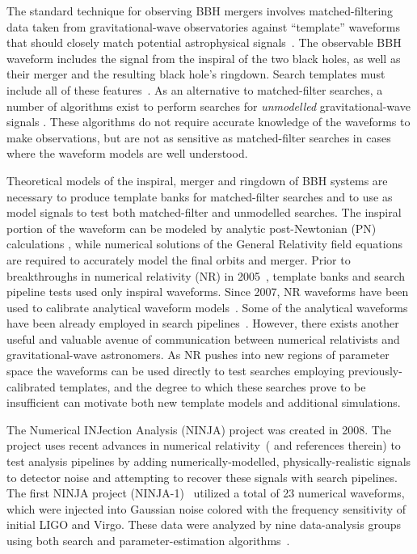 \documentclass[12pt]{iopart}
\begin{document}
The standard technique for observing BBH mergers
involves matched-filtering data taken from gravitational-wave observatories 
against ``template'' waveforms that should closely match potential 
astrophysical signals~\cite{Wainstein:1962,Wainstein:1968,Allen:2005fk}. The
observable BBH waveform includes the signal from the inspiral of the
two black holes, as well as their merger and the resulting black
hole's ringdown. Search templates must include all of these
features~\cite{Buonanno:2009zt,Brown:2012nn}.  As an alternative to
matched-filter searches, a number of algorithms exist to perform
searches for \emph{unmodelled} gravitational-wave signals
\cite{Klimenko:2008fu,Searle:2007uv,Sutton:2009gi}. These algorithms
do not require accurate knowledge of the waveforms to make
observations, but are not as sensitive as matched-filter searches in
cases where the waveform models are well understood.

Theoretical models of the inspiral, merger and ringdown of BBH systems
are necessary to produce template banks for matched-filter searches
and to use as model signals to test both matched-filter and unmodelled
searches.  The inspiral portion of the waveform can be modeled by
analytic post-Newtonian (PN) calculations
\cite{Blanchet:2006zz,Buonanno:2009zt}, while numerical solutions of
the General Relativity field equations are required to accurately
model the final orbits and merger.  Prior to breakthroughs in
numerical relativity (NR) in
2005~\cite{Pretorius:2005gq,Campanelli:2005dd, Baker:2005vv}, template
banks and search pipeline tests used only inspiral waveforms.  Since
2007, NR waveforms have been used to calibrate analytical waveform
models~\cite{Buonanno:2007pf,Damour:2009kr,Pan:2011gk,Taracchini:2012ig,
Ajith:2009bn,Santamaria:2010yb,Damour:2012ky,Taracchini:2013rva}. Some
of the analytical waveforms have been already employed in search
pipelines~\cite{Aasi:2012rja}.  However, there exists another
useful and valuable avenue of communication between numerical
relativists and gravitational-wave astronomers.  As NR pushes into new
regions of parameter space the waveforms can be used directly to test
searches employing previously-calibrated templates, and the degree to
which these searches prove to be insufficient can motivate both new
template models and additional simulations.

The Numerical INJection Analysis (NINJA) project was created in 2008. 
The project uses recent 
advances in numerical relativity~(\cite{Centrella:2010mx} and references
therein) to test analysis 
pipelines by adding numerically-modelled, physically-realistic signals to 
detector noise and attempting to recover these signals with search pipelines.
The first NINJA project (NINJA-1)~\cite{Aylott:2009ya} utilized a total of
23 numerical waveforms, which were injected into Gaussian noise colored with
the frequency sensitivity of initial LIGO and Virgo. These data were
analyzed by nine data-analysis groups using both search and
parameter-estimation algorithms~\cite{Aylott:2009ya}.  
\end{document}
